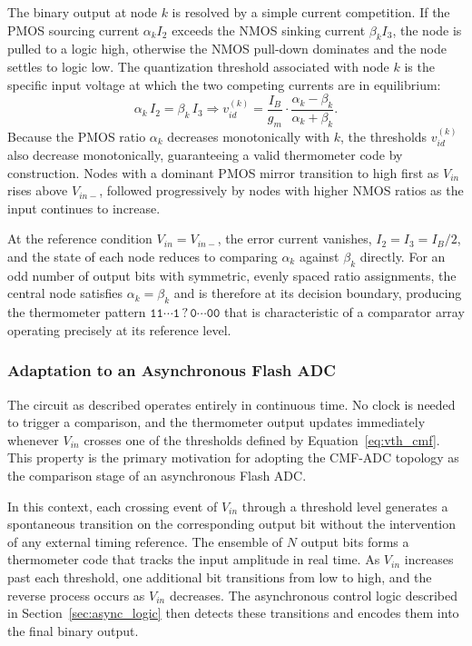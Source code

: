 The binary output at node $k$ is resolved by a simple current competition. If the PMOS
sourcing current $\alpha_k I_2$ exceeds the NMOS sinking current $\beta_k I_3$, the node
is pulled to a logic high, otherwise the NMOS pull-down dominates and the node settles
to logic low. The quantization threshold associated with node $k$ is the specific input
voltage at which the two competing currents are in equilibrium:
%
\begin{equation}
    \alpha_k \, I_2 = \beta_k \, I_3 \Rightarrow
    v_{id}^{(k)} = \frac{I_B}{g_m} \cdot \frac{\alpha_k - \beta_k}{\alpha_k + \beta_k}.
    \label{eq:vth_cmf}
\end{equation}
%
Because the PMOS ratio $\alpha_k$ decreases monotonically with $k$, the
thresholds $v_{id}^{(k)}$ also decrease monotonically, guaranteeing a valid thermometer
code by construction. Nodes with a dominant PMOS mirror transition to high first as
$V_{in}$ rises above $V_{in-}$, followed progressively by nodes with higher NMOS ratios
as the input continues to increase.

At the reference condition $V_{in} = V_{in-}$, the error current vanishes, $I_2 = I_3 = I_B/2$,
and the state of each node reduces to comparing $\alpha_k$ against $\beta_k$ directly.
For an odd number of output bits with symmetric, evenly spaced ratio assignments, the
central node satisfies $\alpha_k = \beta_k$ and is therefore at its decision boundary,
producing the thermometer pattern $\mathtt{11{\cdots}1\,?\,0{\cdots}00}$ that is
characteristic of a comparator array operating precisely at its reference level.

\subsubsection{Adaptation to an Asynchronous Flash ADC}

The circuit as described operates entirely in continuous time. No clock is needed to
trigger a comparison, and the thermometer output updates immediately whenever $V_{in}$
crosses one of the thresholds defined by Equation~\eqref{eq:vth_cmf}. This property is
the primary motivation for adopting the CMF-ADC topology as the comparison stage
of an asynchronous Flash ADC.

In this context, each crossing event of $V_{in}$ through a threshold level generates a
spontaneous transition on the corresponding output bit without the intervention of any
external timing reference. The ensemble of $N$ output bits forms a thermometer code that
tracks the input amplitude in real time. As $V_{in}$ increases past each threshold, one
additional bit transitions from low to high, and the reverse process occurs as $V_{in}$
decreases. The asynchronous control logic described in Section~\ref{sec:async_logic} then
detects these transitions and encodes them into the final binary output.


